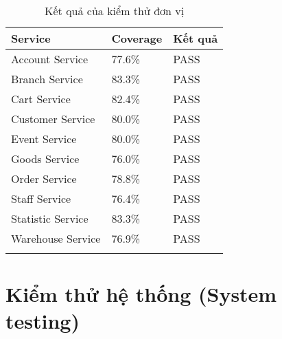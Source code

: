 {
    \setlength\extrarowheight{6pt}
    \begin{longtable}{| p{4cm}| p{4cm}| p{4cm} |}
        \hline
        \textbf{Service}  & \textbf{Coverage} & \textbf{Kết quả} \\
        \hline
        Account Service   & 77.6\%            & PASS             \\
        \hline
        Branch Service    & 83.3\%            & PASS             \\
        \hline
        Cart Service      & 82.4\%            & PASS             \\
        \hline
        Customer Service  & 80.0\%            & PASS             \\
        \hline
        Event Service     & 80.0\%            & PASS             \\
        \hline
        Goods Service     & 76.0\%            & PASS             \\
        \hline
        Order Service     & 78.8\%            & PASS             \\
        \hline
        Staff Service     & 76.4\%            & PASS             \\
        \hline
        Statistic Service & 83.3\%            & PASS             \\
        \hline
        Warehouse Service & 76.9\%            & PASS             \\
        \hline
        \caption{Kết quả của kiểm thử đơn vị}
    \end{longtable}
}


\section{Kiểm thử hệ thống (System testing)}
